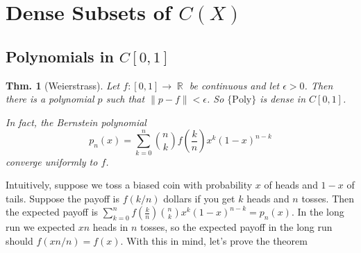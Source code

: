 \documentclass[12pt, a4paper]{book}
\DeclareMathOperator{\R}{\mathbb{R}}
\newcommand{\norm}[1]{\left\lVert#1\right\rVert} %
\newtheorem{theorem}{Thm.}[section]
\theoremstyle{nonumberplain}
\begin{document}
\section{Dense Subsets of $C(X)$}
\subsection{Polynomials in $C[0,1]$}
\begin{theorem}[Weierstrass]
    Let $f:[0,1]\to\R$ be continuous and let $\epsilon>0$.
    Then there is a polynomial $p$ such that $\norm{p-f}<\epsilon$. So $\{\text{Poly}\}$ is dense in $C[0,1]$.

    In fact, the Bernstein polynomial
    \[p_n(x)=\sum\limits_{k=0}^n\binom{n}{k}f\left(\frac{k}{n}\right)x^k(1-x)^{n-k}\]
    converge uniformly to $f$.
\end{theorem}
Intuitively, suppose we toss a biased coin with probability $x$ of heads and $1-x$ of tails.
Suppose the payoff is $f(k/n)$ dollars if you get $k$ heads and $n$ tosses.
Then the expected payoff is $\sum\limits_{k=0}^nf\left(\frac{k}{n}\right)\binom{n}{k}x^k(1-x)^{n-k}=p_n(x)$.
In the long run we expected $xn$ heads in $n$ tosses, so the expected payoff in the long run should $f(xn/n)=f(x)$.
With this in mind, let's prove the theorem
\end{document}
